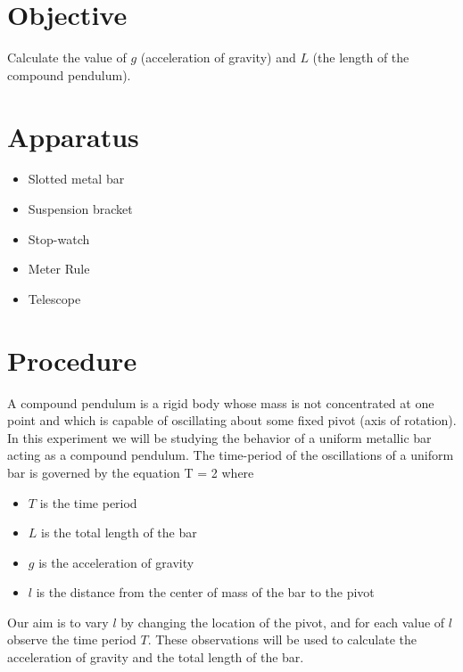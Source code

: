 \documentclass{article}
\begin{document}

   \section*{Objective}
   
      Calculate the value of $g$ (acceleration of gravity) and $L$ (the length of the compound pendulum).


   \section*{Apparatus}

      \begin{itemize}

         \item Slotted metal bar
         \item Suspension bracket
         \item Stop-watch
         \item Meter Rule
         \item Telescope

      \end{itemize}


   \section*{Procedure}

      A compound pendulum is a rigid body whose mass is not concentrated at one point and which is capable of oscillating about some fixed pivot (axis of rotation). In this experiment we will be studying the behavior of a uniform metallic bar acting as a compound pendulum. The time-period of the oscillations of a uniform bar is governed by the equation
      \beq \label{eqn_T}
         T = 2 \pi {}
      \eeq
      where
      \begin{itemize}
         \item $T$ is the time period
         \item $L$ is the total length of the bar
         \item $g$ is the acceleration of gravity
         \item $l$ is the distance from the center of mass of the bar to the pivot
      \end{itemize}

      Our aim is to vary $l$ by changing the location of the pivot, and for each value of $l$ observe the time period $T$. These observations will be used to calculate the acceleration of gravity and the total length of the bar.
\end{document}
